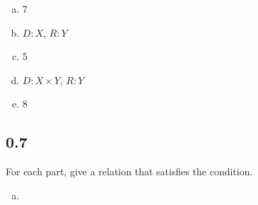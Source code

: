 \documentclass[11pt]{article}
\begin{document}
\begin{enumerate}[a.]
\item 7
\item $D: X$, $R: Y$
\item 5
\item $D: X \times Y$, $R: Y$
\item 8
\end{enumerate}

\subsection*{0.7}
For each part, give a relation that satisfies the condition.
\begin{enumerate}[a.]
\item 
\end{enumerate}
\end{document}
